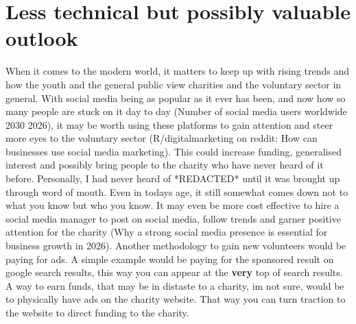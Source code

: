 \documentclass[11pt,a4paper]{article}
\begin{document}
\section{Less technical but possibly valuable outlook}

When it comes to the modern world, it matters to keep up with rising trends and how the youth and the general public view charities and the voluntary sector in general. With social media being as popular as it ever has been, and now how so many people are stuck on it day to day (Number of social media users worldwide 2030 2026), it may be worth using these platforms to gain attention and steer more eyes to the voluntary sector (R/digitalmarketing on reddit: How can businesses use social media marketing). This could increase funding, generalised interest and possibly bring people to the charity who have never heard of it before. Personally, I had never heard of *REDACTED* until it was brought up through word of mouth. Even in todays age, it still somewhat comes down not to what you know but who you know. It may even be more cost effective to hire a social media manager to post on social media, follow trends and garner positive attention for the charity (Why a strong social media presence is essential for business growth in 2026). Another methodology to gain new volunteers would be paying for ads. A simple example would be paying for the sponsored result on google search results, this way you can appear at the \textbf{very} top of search results. A way to earn funds, that may be in distaste to a charity, im not sure, would be to physically have ads on the charity website. That way you can turn traction to the website to direct funding to the charity. 
\end{document}
